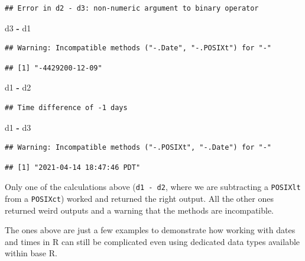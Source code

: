 \documentclass[
]{book}
\newenvironment{Shaded}{\begin{snugshade}}{\end{snugshade}}
\newcommand{\NormalTok}[1]{#1}
\newcommand{\SpecialCharTok}[1]{\textcolor[rgb]{0.81,0.36,0.00}{\textbf{#1}}}
\begin{document}
\begin{verbatim}
## Error in d2 - d3: non-numeric argument to binary operator
\end{verbatim}

\begin{Shaded}
\begin{Highlighting}[]
\NormalTok{d3 }\SpecialCharTok{{-}}\NormalTok{ d1}
\end{Highlighting}
\end{Shaded}

\begin{verbatim}
## Warning: Incompatible methods ("-.Date", "-.POSIXt") for "-"
\end{verbatim}

\begin{verbatim}
## [1] "-4429200-12-09"
\end{verbatim}

\begin{Shaded}
\begin{Highlighting}[]
\NormalTok{d1 }\SpecialCharTok{{-}}\NormalTok{ d2}
\end{Highlighting}
\end{Shaded}

\begin{verbatim}
## Time difference of -1 days
\end{verbatim}

\begin{Shaded}
\begin{Highlighting}[]
\NormalTok{d1 }\SpecialCharTok{{-}}\NormalTok{ d3}
\end{Highlighting}
\end{Shaded}

\begin{verbatim}
## Warning: Incompatible methods ("-.POSIXt", "-.Date") for "-"
\end{verbatim}

\begin{verbatim}
## [1] "2021-04-14 18:47:46 PDT"
\end{verbatim}

Only one of the calculations above (\texttt{d1\ -\ d2}, where we are subtracting a \texttt{POSIXlt} from a \texttt{POSIXct}) worked and returned the right output. All the other ones returned weird outputs and a warning that the methods are incompatible.

The ones above are just a few examples to demonstrate how working with dates and times in R can still be complicated even using dedicated data types available within base R.
\end{document}
